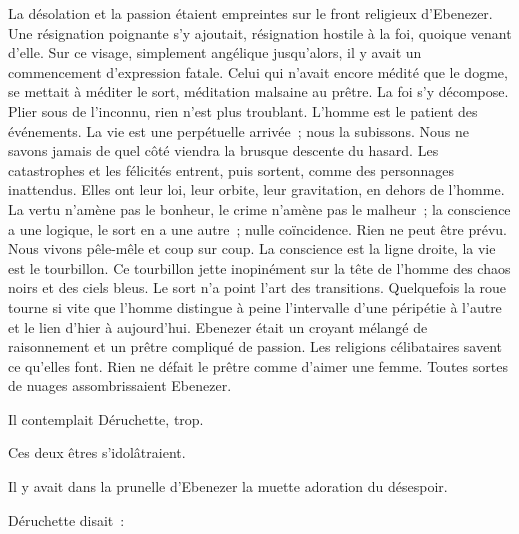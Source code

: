 \documentclass[french,twoside]{book} %
\begin{document}
La désolation et la passion étaient empreintes sur le front religieux d’Ebenezer. Une résignation poignante s’y ajoutait, résignation hostile à la foi, quoique venant d’elle. Sur ce visage, simplement angélique jusqu’alors, il y avait un commencement d’expression fatale. Celui qui n’avait encore médité que le dogme, se mettait à méditer le sort, méditation malsaine au prêtre. La foi s’y décompose. Plier sous de l’inconnu, rien n’est plus troublant. L’homme est le patient des événements. La vie est une perpétuelle arrivée ; nous la subissons. Nous ne savons jamais de quel côté viendra la brusque descente du hasard. Les catastrophes et les félicités entrent, puis sortent, comme des personnages inattendus. Elles ont leur loi, leur orbite, leur gravitation, en dehors de l’homme. La vertu  n’amène pas le bonheur, le crime n’amène pas le malheur ; la conscience a une logique, le sort en a une autre ; nulle coïncidence. Rien ne peut être prévu. Nous vivons pêle-mêle et coup sur coup. La conscience est la ligne droite, la vie est le tourbillon. Ce tourbillon jette inopinément sur la tête de l’homme des chaos noirs et des ciels bleus. Le sort n’a point l’art des transitions. Quelquefois la roue tourne si vite que l’homme distingue à peine l’intervalle d’une péripétie à l’autre et le lien d’hier à aujourd’hui. Ebenezer était un croyant mélangé de raisonnement et un prêtre compliqué de passion. Les religions célibataires savent ce qu’elles font. Rien ne défait le prêtre comme d’aimer une femme. Toutes sortes de nuages assombrissaient Ebenezer.\par
Il contemplait Déruchette, trop.\par
Ces deux êtres s’idolâtraient.\par
Il y avait dans la prunelle d’Ebenezer la muette adoration du désespoir.\par
Déruchette disait :\par
\end{document}
